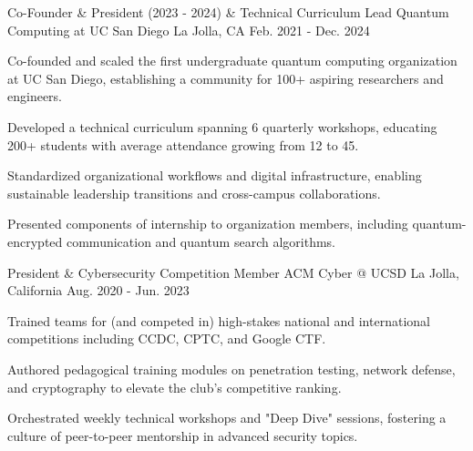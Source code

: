 

\begin{cventries}

  \cventry
    {Co-Founder \& President (2023 - 2024) \& Technical Curriculum Lead} 
    {Quantum Computing at UC San Diego} 
    {La Jolla, CA} 
    {Feb. 2021 - Dec. 2024} 
    {
      \begin{cvitems} 
        \item {Co-founded and scaled the first undergraduate quantum computing organization at UC San Diego, establishing a community for 100+ aspiring researchers and engineers.}
        \item {Developed a technical curriculum spanning 6 quarterly workshops, educating 200+ students with average attendance growing from 12 to 45.}
        \item {Standardized organizational workflows and digital infrastructure, enabling sustainable leadership transitions and cross-campus collaborations.}
        \item {Presented components of internship to organization members, including quantum-encrypted communication and quantum search algorithms.}
      \end{cvitems}
    }
    
  \cventry
    {President \& Cybersecurity Competition Member} 
    {ACM Cyber @ UCSD} 
    {La Jolla, California} 
    {Aug. 2020 - Jun. 2023} 
    {
      \begin{cvitems} 
        \item {Trained teams for (and competed in) high-stakes national and international competitions including CCDC, CPTC, and Google CTF.}
        \item {Authored pedagogical training modules on penetration testing, network defense, and cryptography to elevate the club's competitive ranking.}
        \item {Orchestrated weekly technical workshops and "Deep Dive" sessions, fostering a culture of peer-to-peer mentorship in advanced security topics.}
      \end{cvitems}
    }


\end{cventries}
